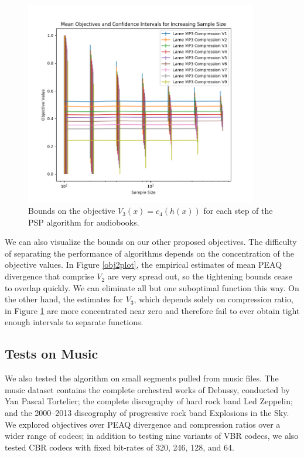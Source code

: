 \documentclass{article}
\begin{document}
{\begin{figure}
    \centering
    \includegraphics[width=4in]{codec_figures/obj3plot_py.png}
    \caption{Bounds on the objective $V_3(x) = c_4(h(x))$ for each step of the PSP algorithm for audiobooks.}
    \label{obj3plot}
\end{figure}

We can also visualize the bounds on our other proposed objectives. The difficulty of separating the performance of algorithms depends on the concentration of the objective values. In Figure \ref{obj2plot}, the empirical estimates of mean PEAQ divergence that comprise $V_2$ are very spread out, so the tightening bounds cease to overlap quickly. We can eliminate all but one suboptimal function this way. On the other hand, the estimates for $V_3$, which depends solely on compression ratio, in Figure \ref{obj3plot} are more concentrated near zero and therefore fail to ever obtain tight enough intervals to separate functions.

\subsection{Tests on Music}

We also tested the algorithm on small segments pulled from music files. The music dataset contains the complete orchestral works of Debussy, conducted by Yan Pascal Tortelier; the complete discography of hard rock band Led Zeppelin; and the 2000--2013 discography of progressive rock band Explosions in the Sky. We explored objectives over PEAQ divergence and compression ratios over a wider range of codecs; in addition to testing nine variants of VBR codecs, we also tested CBR codecs with fixed bit-rates of 320, 246, 128, and 64.

}
\end{document}
